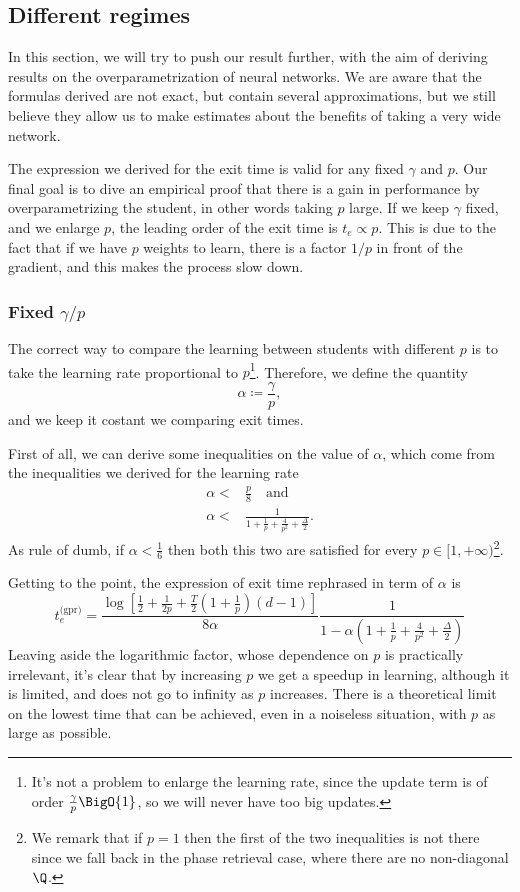 \subsection{Different regimes}
In this section, we will try to push our result further, with the aim of deriving results on the overparametrization of neural networks.
We are aware that the formulas derived are not exact, but contain several approximations,
but we still believe they allow us to make estimates about the benefits of taking a very wide network.

The expression we derived for the exit time is valid for any fixed \(\gamma\) and \(p\).
Our final goal is to dive an empirical proof that there is a gain in performance by overparametrizing the student,
in other words taking \(p\) large. If we keep \(\gamma\) fixed, and we enlarge \(p\), the leading order of the exit time 
is \(t_e \propto p\). This is due to the fact that if we have \(p\) weights to learn, there is a factor \(1/p\) in front of the gradient,
and this makes the process slow down. 

\subsubsection{Fixed $\gamma/p$}
The correct way to compare the learning between students with different \(p\) is to take the learning rate proportional to \(p\)\footnote{
  It's not a problem to enlarge the learning rate, since the update term is of order \(\frac{\gamma}{p}\BigO{1}\),
  so we will never have too big updates.
}.
Therefore, we define the quantity \[\alpha \coloneqq \frac{\gamma}{p},\] and we keep it costant we comparing exit times.

First of all, we can derive some inequalities on the value of \(\alpha\),
which come from the inequalities we derived for the learning rate
\[\begin{split}
  \alpha <& \frac{p}{8} \quad\text{and}\\
  \alpha <& \frac{1}{1 +\frac{1}{p} + \frac{4}{p^2} + \frac\Delta2}.
\end{split}\]
As rule of dumb, if \(\alpha<\frac16\) then both this two are satisfied for every \(p\in[1,+\infty)\)\footnote{
  We remark that if \(p=1\) then the first of the two inequalities is not there since we fall back in the 
  phase retrieval case, where there are no non-diagonal \(\Q\).
}. 

Getting to the point, the expression of exit time rephrased in term of \(\alpha\) is 
\[
  t^\text{(gpr)}_e = \frac{\log\left[\frac12+\frac{1}{2p}+\frac{T}{2}\left(1+\frac{1}{p}\right)(d-1)\right]}{8\alpha} \frac{1}{1- \alpha\left(1+\frac{1}{p}+\frac{4}{p^2}+\frac{\Delta}{2}\right)}
\]
Leaving aside the logarithmic factor, whose dependence on \(p\) is practically irrelevant, 
it's clear that by increasing \(p\) we get a speedup in learning, although it is limited, and does not go to infinity as \(p\) increases.
There is a theoretical limit on the lowest time that can be achieved, even in a noiseless situation, with \(p\) as large as possible.


